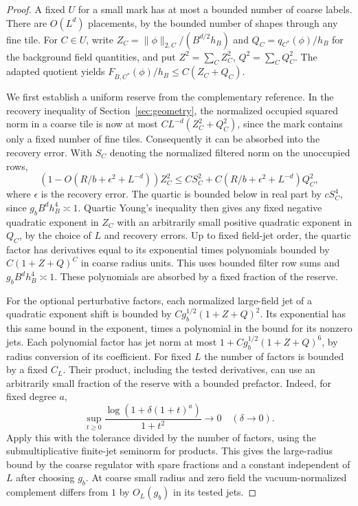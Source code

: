 \documentclass[11pt]{article}
\theoremstyle{definition}
\begin{document}
\begin{proof}
A fixed \(U\) for a small mark has at most a bounded number of
coarse labels. There are \(O(L^d)\) placements, by the bounded
number of shapes through any fine tile. For \(C\in U\), write
\(Z_C=\|\phi\|_{2,C}/(B^{d/2}h_B)\) and
\(Q_C=q_{C^*}(\phi)/h_B\) for the background field quantities,
and put \(Z^2=\sum_C Z_C^2\), \(Q^2=\sum_C Q_C^2\).
The adapted quotient yields \(F_{B,C^*}(\phi)/h_B
\le C(Z_C+Q_C)\).

We first establish a uniform reserve from the complementary
reference. In the recovery inequality of
Section~\ref{sec:geometry}, the normalized occupied squared norm
in a coarse tile is now at most \(C L^{-d}(Z_C^2+Q_C^2)\), since
the mark contains only a fixed number of fine tiles.
Consequently it can be absorbed into the recovery error.
With \(S_C\) denoting the normalized filtered norm on the
unoccupied rows,
\begin{equation}
 (1-O(R/b+\epsilon^2+L^{-d}))Z_C^2
 \le C S_C^2 + C(R/b+\epsilon^2+L^{-d})Q_C^2,
\end{equation}
where \(\epsilon\) is the recovery error. The quartic is bounded
below in real part by \(c S_C^4\), since \(g_b B^d h_B^4\asymp1\).
Quartic Young's inequality then gives any fixed negative
quadratic exponent in \(Z_C\) with an arbitrarily small
positive quadratic exponent in \(Q_C\), by the choice of
\(L\) and recovery errors. Up to fixed field-jet order, the
quartic factor has derivatives equal to its exponential
times polynomials bounded by \(C(1+Z+Q)^C\) in coarse radius
units. This uses bounded filter row sums and
\(g_b B^d h_B^4\asymp1\). These polynomials are absorbed by a
fixed fraction of the reserve.

For the optional perturbative factors, each normalized
large-field jet of a quadratic exponent shift is bounded
by \(C g_b^{1/2}(1+Z+Q)^2\). Its exponential has this same
bound in the exponent, times a polynomial in the bound for its
nonzero jets. Each polynomial factor has
jet norm at most \(1+C g_b^{1/2}(1+Z+Q)^6\), by radius
conversion of its coefficient. For fixed \(L\) the number
of factors is bounded by a fixed \(C_L\). Their product,
including the tested derivatives, can use an arbitrarily
small fraction of the reserve with a bounded prefactor.
Indeed, for fixed degree \(a\),
\begin{equation}
 \sup_{t\ge0}\frac{\log(1+\delta(1+t)^a)}{1+t^2}\longrightarrow0
 \quad(\delta\to0).
\end{equation}
Apply this with the tolerance divided by the number of factors,
using the submultiplicative finite-jet seminorm for products.
This gives the large-radius bound by the coarse regulator
with spare fractions and a constant independent of \(L\)
after choosing \(g_b\). At coarse small radius and zero
field the vacuum-normalized complement differs from \(1\)
by \(O_L(g_b)\) in its tested jets.


\end{proof}
\end{document}
